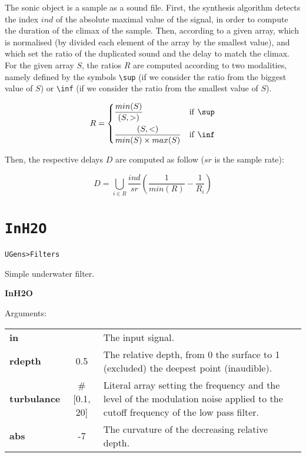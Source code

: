 \bigskip
The sonic object is a sample as a sound file. First, the synthesis algorithm detects the index $ind$ of the absolute maximal value of the signal, in order to compute the duration of the climax of the sample. Then, according to a given array, which is normalised (by divided each element of the array by the smallest value), and which set the ratio of the duplicated sound and the delay to match the climax. For the given array $S$, the ratios $R$ are computed according to two modalities, namely defined by the symbols \texttt{\textbackslash sup} (if we consider the ratio from the biggest value of $S$) or \texttt{\textbackslash inf} (if we consider the ratio from the smallest value of $S$).

\[
     R =
\begin{dcases}
	\frac{min(S)}{(S, >)}  & \text{if \texttt{\textbackslash sup}}\\
	\frac{(S, <)}{min(S) \times max(S)}  & \text{if \texttt{\textbackslash inf}} 
   \end{dcases}
\]

\bigskip
Then, the respective delays $D$ are computed as follow ($sr$ is the sample rate):
 
\[
D = \bigcup_{i \in R} \frac{ind}{sr}  \left( \frac{1}{min(R)} - \frac{1}{R_i} \right)
\]


\section{\texttt{InH2O}}
\label{inh2o}

\texttt{UGens>Filters}

\bigskip

Simple underwater filter.

\bigskip
\begin{addmargin}[1em]{0em}%
\begin{mdframed}[style=mystyle]

\bigskip

{\large \textbf{InH2O}}

\hrulefill

\color{gray!80}Arguments:\color{black} 

\bigskip

\begin{tabular}{l c p{6cm}}
\textbf{in} &  & The input signal.\\
\textbf{rdepth} & 0.5 & The relative depth, from 0 the surface to 1 (excluded) the deepest point (inaudible).\\
\textbf{turbulance} & \#[0.1, 20] &  Literal array setting the frequency and the level of the modulation noise applied to the cutoff frequency of the low pass filter.\\
\textbf{abs} & -7 & The curvature of the decreasing relative depth.
\end{tabular}

\bigskip

\end{mdframed}
\end{addmargin}


